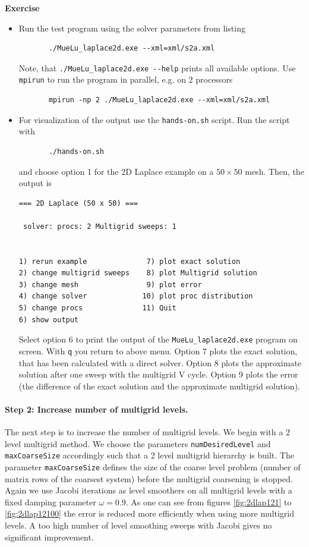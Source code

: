 \documentclass[12pt,a4paper]{article}
\begin{document}
\begin{graybox}
 \textbf{Exercise}
 \begin{itemize}
 \item Run the test program using the solver parameters from listing%
       \begin{verbatim}
       ./MueLu_laplace2d.exe --xml=xml/s2a.xml
       \end{verbatim}
       Note, that \verb|./MueLu_laplace2d.exe --help| prints all available options. Use \verb|mpirun| to run the program in parallel, e.g. on 2 processors
       \begin{verbatim}
       mpirun -np 2 ./MueLu_laplace2d.exe --xml=xml/s2a.xml
       \end{verbatim}
 \item For visualization of the output use the \verb|hands-on.sh| script. Run the script with
       \begin{verbatim}
       ./hands-on.sh
       \end{verbatim}
       and choose option 1 for the 2D Laplace example on a $50\times 50$ mesh. Then, the output is
       \begin{verbatim}
=== 2D Laplace (50 x 50) ===

 solver: procs: 2 Multigrid sweeps: 1


1) rerun example              7) plot exact solution
2) change multigrid sweeps    8) plot Multigrid solution
3) change mesh                9) plot error
4) change solver             10) plot proc distribution
5) change procs              11) Quit
6) show output
       \end{verbatim}
       Select option 6 to print the output of the \verb|MueLu_laplace2d.exe| program on screen. With \verb|q| you return to above menu. Option 7 plots the exact solution, that has been calculated with a direct solver. Option 8 plots the approximate solution after one sweep with the multigrid V cycle. Option 9 plots the error (the difference of the exact solution and the approximate multigrid solution).
 \end{itemize}
 \end{graybox}

\paragraph{Step 2: Increase number of multigrid levels.}
The next step is to increase the number of multigrid levels. We begin with a 2 level multigrid method. We choose the parameters \texttt{numDesiredLevel} and \texttt{maxCoarseSize} accordingly such that a 2 level multigrid hierarchy is built. The parameter \texttt{maxCoarseSize} defines the size of the coarse level problem (number of matrix rows of the coarsest system) before the multigrid coarsening is stopped. Again we use Jacobi iterations as level smoothers on all multigrid levels with a fixed damping parameter $\omega=0.9$.
As one can see from figures  \ref{fig:2dlap121} to \ref{fig:2dlap12100} the error is reduced more efficiently when using more multigrid levels. A too high number of level smoothing sweeps with Jacobi gives no significant improvement.
\end{document}

